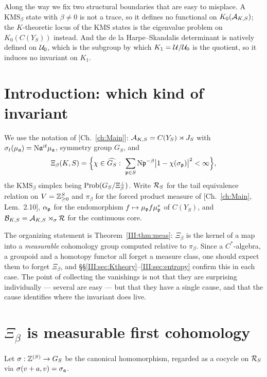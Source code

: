 \begin{summary}
Along the way we fix two structural boundaries that are easy to misplace. A
$\mathrm{KMS}_\beta$ state with $\beta\ne0$ is not a trace, so it defines no functional on
$K_0(\mathcal{A}_{K,S})$; the $K$-theoretic locus of the KMS states is the eigenvalue problem on
$K_0(C(Y_S))$ instead. And the de la Harpe--Skandalis determinant is natively defined on
$\mathcal{U}_0$, which is the subgroup by which $K_1=\mathcal{U}/\mathcal{U}_0$ is the quotient, so it induces no
invariant on $K_1$.
\end{summary}

\section{Introduction: which kind of invariant}

We use the notation of [Ch.~\ref{ch:Main}]: $\mathcal{A}_{K,S}=C(Y_S)\rtimes J_S$ with
$\sigma_t(\mu_{\mathfrak{a}})=\mathrm{N}\mathfrak{a}^{it}\mu_{\mathfrak{a}}$, symmetry group $G_S$, and
\begin{equation}\label{III:eq:Xi}
\Xi_\beta(K,S)=\Bigl\{\chi\in\widehat{G_S}:\ \sum_{\mathfrak{p}\in S}\mathrm{N}\mathfrak{p}^{-\beta}\bigl|1-\chi(\sigma_{\mathfrak{p}})\bigr|^2<\infty\Bigr\},
\end{equation}
the $\mathrm{KMS}_\beta$ simplex being $\mathrm{Prob}(G_S/\Xi_\beta^\perp)$. Write
$\mathcal{R}_S$ for the tail equivalence relation on $V=\mathbb{Z}_{\ge0}^S$ and $\pi_\beta$ for the forced
product measure of [Ch.~\ref{ch:Main}, Lem.~2.10], $\alpha_{\mathfrak{p}}$ for the endomorphism
$f\mapsto\mu_{\mathfrak{p}} f\mu_{\mathfrak{p}}^*$ of $C(Y_S)$, and $\mathcal{B}_{K,S}=\mathcal{A}_{K,S}\rtimes_\sigma\mathcal{R}$ for the
continuous core.

The organizing statement is Theorem~\ref{III:thm:meas}: $\Xi_\beta$ is the kernel of a map into
a \emph{measurable} cohomology group computed relative to $\pi_\beta$. Since a
$C^*$-algebra, a groupoid and a homotopy functor all forget a measure class, one should
expect them to forget $\Xi_\beta$, and \S\S\ref{III:sec:Ktheory}--\ref{III:sec:entropy} confirm this
in each case. The point of collecting the vanishings is not that they are surprising
individually --- several are easy --- but that they have a single cause, and that the cause
identifies where the invariant does live.

\section{$\Xi_\beta$ is measurable first cohomology}\label{III:sec:meas}

Let $\sigma:\mathbb{Z}^{(S)}\to G_S$ be the canonical homomorphism, regarded as a cocycle on
$\mathcal{R}_S$ via $\sigma(v+a,v)=\sigma_{\mathfrak{a}}$.

